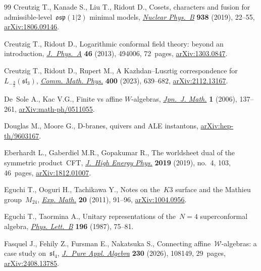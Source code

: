 \documentclass[10pt,a4paper]{amsart}
\numberwithin{equation}{section}
\begin{document}
\begin{thebibliography}{99}
Creutzig T., Kanade S., Liu T., Ridout D., Cosets, characters and fusion for
 admissible-level~{$\mathfrak{osp}(1|2)$} minimal models,
 \href{https://doi.org/10.1016/j.nuclphysb.2018.10.022}{\textit{Nuclear
 Phys.~B}} \textbf{938} (2019), 22--55,
 \href{http://arxiv.org/abs/1806.09146}{arXiv:1806.09146}.

Creutzig T., Ridout D., Logarithmic conformal field theory: beyond an
 introduction,
 \href{https://doi.org/10.1088/1751-8113/46/49/494006}{\textit{J.~Phys.~A}}
 \textbf{46} (2013), 494006, 72~pages,
 \href{http://arxiv.org/abs/1303.0847}{arXiv:1303.0847}.

Creutzig T., Ridout D., Rupert M., A {K}azhdan--{L}usztig correspondence
 for~{$L_{-\frac32}(\mathfrak{sl}_3)$},
 \href{https://doi.org/10.1007/s00220-022-04602-8}{\textit{Comm. Math. Phys.}}
 \textbf{400} (2023), 639--682,
 \href{http://arxiv.org/abs/2112.13167}{arXiv:2112.13167}.

De~Sole A., Kac V.G., Finite vs affine {$W$}-algebras,
 \href{https://doi.org/10.1007/s11537-006-0505-2}{\textit{Jpn.~J. Math.}}
 \textbf{1} (2006), 137--261,
 \href{http://arxiv.org/abs/math-ph/0511055}{arXiv:math-ph/0511055}.

Douglas M., Moore G., D-branes, quivers and {ALE} instantons,
 \href{http://arxiv.org/abs/hep-th/9603167}{arXiv:hep-th/9603167}.

Eberhardt L., Gaberdiel M.R., Gopakumar R., The worldsheet dual of the
 symmetric product~{CFT},
 \href{https://doi.org/10.1007/jhep04(2019)103}{\textit{J.~High Energy Phys.}}
 \textbf{2019} (2019), no.~4, 103, 46~pages,
 \href{http://arxiv.org/abs/1812.01007}{arXiv:1812.01007}.

Eguchi T., Ooguri H., Tachikawa Y., Notes on the~{$K3$} surface and the
 {M}athieu group~{$M_{24}$},
 \href{https://doi.org/10.1080/10586458.2011.544585}{\textit{Exp. Math.}}
 \textbf{20} (2011), 91--96,
 \href{http://arxiv.org/abs/1004.0956}{arXiv:1004.0956}.

Eguchi T., Taormina A., Unitary representations of the~{$N=4$} superconformal
 algebra, \href{https://doi.org/10.1016/0370-2693(87)91679-0}{\textit{Phys.
 Lett.~B}} \textbf{196} (1987), 75--81.

Fasquel J., Fehily Z., Fursman E., Nakatsuka S., Connecting
 affine~{$\mathcal{W}$}-algebras: a case study on~{$\mathfrak{sl}_{4}$},
 \href{https://doi.org/10.1016/j.jpaa.2025.108149}{\textit{J.~Pure Appl.
 Algebra}} \textbf{230} (2026), 108149, 29~pages,
 \href{http://arxiv.org/abs/2408.13785}{arXiv:2408.13785}.


\end{thebibliography}
\end{document}

